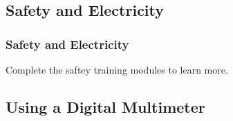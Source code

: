\documentclass[fleqn]{beamer} %
\newcommand{\sectionIsubsectionItitle}{Safety and Electricity}
\newcommand{\sectionIsubsectionIItitle}{Using a Digital Multimeter}
\begin{document}
		\subsection{\sectionIsubsectionItitle}\label{sectionIsubsectionI}

			\begin{frame}
				\frametitle{\sectionIsubsectionItitle}

				Complete the saftey training modules to learn more. 

			\end{frame}

		\subsection{\sectionIsubsectionIItitle}\label{sectionIsubsectionII}
\end{document}
